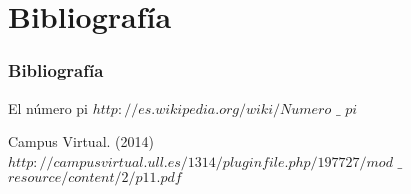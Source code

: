 \documentclass{beamer}
\begin{document}
\section{Bibliografía}
\begin{frame}
  \frametitle{Bibliografía}

  \begin{thebibliography}{10}

    \beamertemplatebookbibitems
    El número pi 
    {\small $http://es.wikipedia.org/wiki/Numero$ $\_$ $pi$}

    \beamertemplatebookbibitems
    Campus Virtual. 
    (2014) 
    {\small $http://campusvirtual.ull.es/1314/pluginfile.php/197727/mod$ $\_$ $resource/content/2/p11.pdf$}

  \end{thebibliography}
\end{frame}

\end{document}
